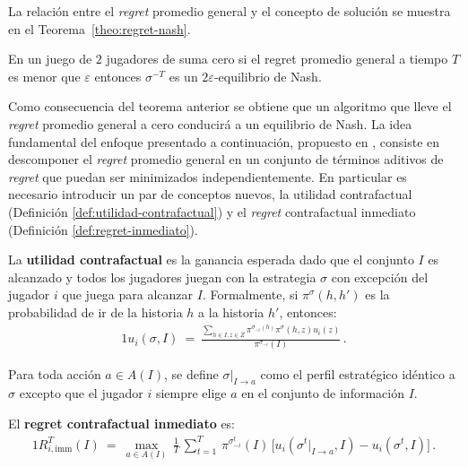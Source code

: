 La relación entre el \textit{regret} promedio general y el concepto de solución se muestra en el Teorema~\ref{theo:regret-nash}.
\begin{theorem}
\label{theo:regret-nash}
En un juego de $2$ jugadores de suma cero si el regret promedio general a tiempo $T$ es menor que $\varepsilon$ entonces $\sigma^{-T}$ es un $2\varepsilon$-equilibrio de Nash.
\end{theorem}

Como consecuencia del teorema anterior se obtiene que un algoritmo que lleve el \mbox{\textit{regret}} promedio general a cero conducirá a un equilibrio de Nash. La idea fundamental del enfoque presentado a continuación, propuesto en \cite{bib:cfr}, consiste en descomponer el \textit{regret} promedio general en un conjunto de términos aditivos de \textit{regret} que puedan ser minimizados independientemente. En particular es necesario introducir un par de conceptos nuevos, la utilidad contrafactual (Definición \ref{def:utilidad-contrafactual}) y el \textit{regret} contrafactual inmediato (Definición \ref{def:regret-inmediato}).

\begin{definition}
\label{def:utilidad-contrafactual}
La \textbf{utilidad contrafactual} es la ganancia esperada dado que el conjunto $I$ es alcanzado y todos los jugadores juegan con la estrategia $\sigma$ con excepción del jugador $i$ que juega para alcanzar $I$. Formalmente, si $\pi^{\sigma}(h, h')$ es la probabilidad de ir de la historia $h$ a la historia $h'$, entonces:
\begin{alignat}{1}
u_i(\sigma, I)\ =\ \frac{\sum_{h \in I, z \in Z} \pi^{\sigma_{-i}(h)} \pi^{\sigma}(h, z) u_i(z)}{\pi^{\sigma_{-i}}(I)} \,.
\end{alignat}
\end{definition}

Para toda acción $a \in A(I)$, se define $\sigma|_{I \rightarrow a}$ como el perfil estratégico idéntico a $\sigma$ excepto que el jugador $i$ siempre elige $a$ en el conjunto de información $I$.

\begin{definition}
\label{def:regret-inmediato}
El \textbf{regret contrafactual inmediato} es:
\begin{alignat}{1}
R_{i, \text{imm}}^T(I)\ =\  \max_{a \in A(I)} \, \frac{1}{T} \, \sum_{t = 1}^T \, \pi^{\sigma_{-i}^t}(I) \, \bigl[ u_i(\sigma^t|_{I \rightarrow a}, I) - u_i(\sigma^t, I) \bigr]\,.
\end{alignat}
\end{definition}

